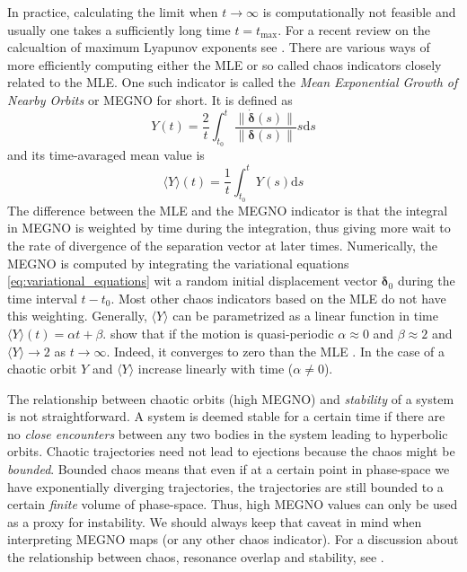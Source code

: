 \documentclass[ twoside,openright,titlepage,numbers=noenddot,headinclude,%
                footinclude=true,cleardoublepage=empty,abstractoff, %
                BCOR=5mm,paper=a4,fontsize=11pt,%
                american,%
                ]{scrreprt}
\begin{document}
In practice, calculating the limit when $t\rightarrow\infty$ is 
computationally not feasible and usually one takes a 
sufficiently long time $t=t_\text{max}$. For a recent review on the calcualtion
of maximum Lyapunov exponents see \cite{skokos}.
There are various ways of more efficiently computing either the MLE or so called
chaos indicators closely related to the MLE. One such indicator is called the 
\emph{Mean Exponential Growth of Nearby Orbits} \citep{refId0,cincotta2003} or MEGNO for short. 
It is defined as
\begin{equation}
    Y(t)= \frac{2}{t} \int^t_{t_0} \frac{\lVert \dot{\boldsymbol{\delta}}(s)\rVert}{\lVert 
    \boldsymbol{\delta}(s)\rVert}s\mathrm{d}s
\end{equation}
and its time-avaraged mean value is 
\begin{equation}
    \langle Y\rangle\left( t\right)= \frac{1}{t} \int^t_{t_0} Y(s)\mathrm{d}s
\end{equation}
The difference between the MLE and the MEGNO indicator is that the integral in MEGNO
is weighted by time during the integration, thus giving more wait to the rate 
of divergence of the separation vector at later times. Numerically, the MEGNO
is computed by integrating the variational equations \cref{eq:variational_equations}
wit a random initial displacement vector $\boldsymbol{\delta}_0$
during the time interval $t-t_0$. Most other chaos indicators based on the
MLE do not have this weighting. 
Generally, $\langle Y\rangle$ can be parametrized as a linear function in time
$\langle Y\rangle (t)=\alpha t+\beta$. \cite{cincotta2003} show that if the 
motion is quasi-periodic $\alpha\approx 0$ and $\beta\approx 2$ and 
$\langle Y\rangle \rightarrow 2$ as $t\rightarrow \infty$. Indeed, it
converges to zero than the MLE \citep{cincotta2003}. In the case of a chaotic
orbit $Y$ and $\langle Y\rangle$ increase linearly with time ($\alpha\neq 0$).

The relationship between chaotic orbits (high MEGNO) and \emph{stability} of
a system is not straightforward. A system is deemed stable for a certain time 
if there are no \emph{close encounters}  between any two bodies in the system 
leading to hyperbolic orbits. Chaotic trajectories need not lead to ejections
because the chaos might be \emph{bounded}. Bounded chaos means that even
if at a certain point in phase-space we have exponentially diverging 
trajectories, the trajectories are still bounded to a certain \emph{finite} 
volume of phase-space. Thus, high MEGNO values can only be used as a proxy
for instability. We should always keep that caveat in mind when 
interpreting MEGNO maps (or any other chaos indicator). For a discussion about 
the relationship between chaos,
 resonance overlap and  stability, see \cite{Deck2013}.
\end{document}
